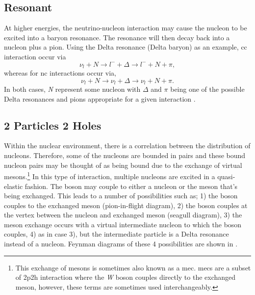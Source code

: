 \subsection*{Resonant}
At higher energies, the neutrino-nucleon interaction may cause the nucleon to be excited into a baryon resonance. The resonance will then decay back into a nucleon plus a pion. Using the Delta resonance (Delta baryon) as an example, \gls{cc} interaction occur via
\begin{equation}
    \nu_l + N \rightarrow l^- + \Delta \rightarrow l^- + N + \pi,
\end{equation}
whereas for \gls{nc} interactions occur via,
\begin{equation}
    \nu_l + N \rightarrow \nu_l + \Delta \rightarrow \nu_l + N +\pi.
\end{equation}
In both cases, \textit{N} represent some nucleon with $\Delta$ and $\pi$ being one of the possible Delta resonances and pions appropriate for a given interaction \cite{Measurement_of_the_Antineutrino_Double-Differential_Charged-Current_Quasi-Elastic_Scattering_Cross_Section_at_MINERvA_book} \cite{Measurement_of_the_Water_to_Scintillator_Charged-Current_Cross-Section_Ratio_for_Muon_Neutrinos_at_the_T2K_Near_Detector_thesis}. 

\subsection*{2 Particles 2 Holes}
Within the nuclear environment, there is a correlation between the distribution of nucleons. Therefore, some of the nucleons are bounded in pairs and these bound nucleon pairs may be thought of as being bound due to the exchange of virtual mesons.\footnote{This exchange of mesons is sometimes also known as a \gls{mec}. \glspl{mec} are a subset of \gls{2p2h} interaction where the \textit{W} boson couples directly to the exchanged meson, however, these terms are sometimes used interchangeably.} In this type of interaction, multiple nucleons are excited in a quasi-elastic fashion. The boson may couple to either a nucleon or the meson that's being exchanged. This leads to a number of possibilities such as; 1) the boson couples to the exchanged meson (pion-in-flight diagram), 2) the boson couples at the vertex between the nucleon and exchanged meson (seagull diagram), 3) the meson exchange occurs with a virtual intermediate nucleon to which the boson couples, 4) as in case 3), but the intermediate particle is a Delta resonance instead of a nucleon. Feynman diagrams of these 4 possibilities are shown in  \cite{Measurement_of_the_Antineutrino_Double-Differential_Charged-Current_Quasi-Elastic_Scattering_Cross_Section_at_MINERvA_book}\cite{Adjusting_neutrino_interaction_models_and_evaluating_uncertainties_using_NOvA_near_detector_data}
\cite{Seagull_and_pion-in-flight_mec}.

